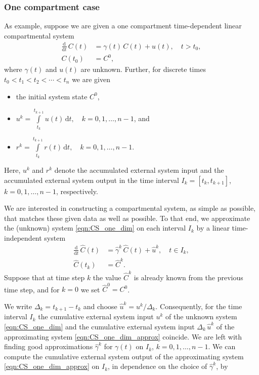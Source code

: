 \documentclass[11pt,a4paper]{article}
\newcommand{\deriv}[1]{\frac{\mathrm{d}}{\mathrm{d}#1}}
\newcommand{\dd}[1]{\,\mathrm{d}#1}
\newcommand{\intl}{\int\limits}
\begin{document}
    \subsubsection{One compartment case}
        As example, suppose we are given a one compartment time-dependent linear compartmental system
        \begin{equation}\label{eqn:CS_one_dim}
            \begin{aligned}
                \deriv{t}\,C(t) &= \gamma(t)\,C(t) + u(t),\quad t>t_0,\\
                C(t_0) &= C^0,
            \end{aligned}
        \end{equation}
        where $\gamma(t)$ and $u(t)$ are unknown.
        Further, for discrete times $t_0<t_1<t_2<\cdots<t_n$ we are given
        \begin{itemize}
            \item the initial system state $C^0$,
            \item $u^k = \intl_{t_k}^{t_{k+1}} u(t)\dd{t},\quad k=0,1,\ldots,n-1$, and
            \item $r^k = \intl_{t_k}^{t_{k+1}} r(t)\dd{t},\quad k=0,1,\ldots,n-1$.
        \end{itemize}
        Here, $u^k$ and $r^k$ denote the accumulated external system input and the accumulated external system output in the time interval $I_k=[t_k,t_{k+1}]$, $k=0,1,\ldots,n-1$, respectively.

        We are interested in constructing a compartmental system, as simple as possible, that matches these given data as well as possible.
        To that end, we approximate the (unknown) system \eqref{eqn:CS_one_dim} on each interval $I_k$ by a linear time-independent system
        \begin{equation}\label{eqn:CS_one_dim_approx}
            \begin{aligned}
                \deriv{t}\,\widehat{C}(t) &= \widehat{\gamma}^k\,\widehat{C}(t) + \widehat{u}^k,\quad t\in I_k,\\
                \widehat{C}(t_k) &= \widehat{C}^k.
            \end{aligned}
        \end{equation}
        Suppose that at time step $k$ the value $\widehat{C}^k$ is already known from the previous time step,
        and for $k=0$ we set $\widehat{C}^0=C^0$.
        
        We write $\Delta_k=t_{k+1}-t_k$ and choose $\widehat{u}^k=u^k/\Delta_k$.
        Consequently, for the time interval $I_k$ the cumulative external system input $u^k$ of the unknown system \eqref{eqn:CS_one_dim} and the cumulative external system input $\Delta_k\,\widehat{u}^k$ of the approximating system \eqref{eqn:CS_one_dim_approx} coincide.
        We are left with finding good approximations $\widehat{\gamma}^k$ for $\gamma(t)$ on $I_k$, $k=0,1,\ldots,n-1$.
        We can compute the cumulative external system output of the approximating system \eqref{eqn:CS_one_dim_approx} on $I_k$, in dependence on the choice of $\widehat{\gamma}^k$, by
        
\end{document}
